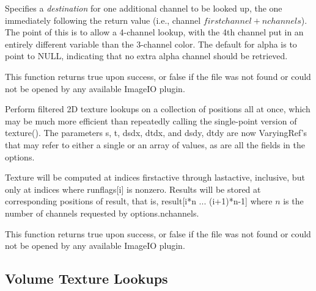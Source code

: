 \vspace{-24pt}
\vspace{10pt}
Specifies a \emph{destination} for one additional channel to be looked
up, the one immediately following the return value (i.e., channel
$\mathit{firstchannel}+\mathit{nchannels}$).  The point of this is to
allow a 4-channel lookup, with the 4th channel put in an entirely
different variable than the 3-channel color.  The default for {\cf
  alpha} is to point to NULL, indicating that no extra alpha channel
should be retrieved.
\apiend

This function returns {\cf true} upon success, or {\cf false} if the
file was not found or could not be opened by any available ImageIO
plugin.
\apiend



Perform filtered 2D texture lookups on a collection of positions all at
once, which may be much more efficient than repeatedly calling the
single-point version of {\cf texture()}.  The parameters {\cf s},
{\cf t}, {\cf dsdx}, {\cf dtdx}, and {\cf dsdy}, {\cf dtdy} are now
{\cf VaryingRef}'s that may refer to either a single or an array of
values, as are all the fields in the {\cf options}.

Texture will be computed at indices {\cf firstactive} through
{\cf lastactive}, inclusive, but only at indices where {\cf runflags[i]}
is nonzero.  Results will be stored at corresponding positions of
{\cf result}, that is, 
{\cf result[i*n ... (i+1)*n-1]} where $n$ is the number of channels
requested by {\cf options.nchannels}.

This function returns {\cf true} upon success, or {\cf false} if the
file was not found or could not be opened by any available ImageIO
plugin.
\apiend

\newpage
\subsection{Volume Texture Lookups}
\label{sec:texturesys:api:texture3d}

